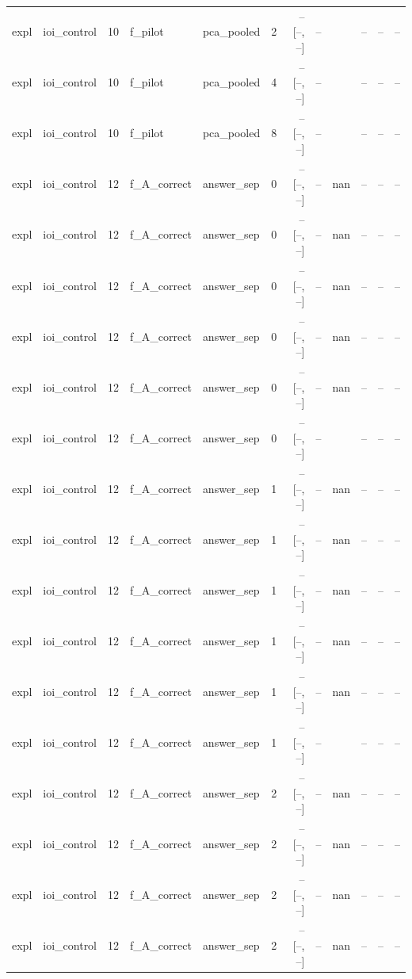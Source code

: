 \begin{tabular}{llrllrrrlrrr}
expl & ioi\_control & 10 & f\_pilot & pca\_pooled & 2 & -- [--, --] & -- &  & -- & -- & -- \\
expl & ioi\_control & 10 & f\_pilot & pca\_pooled & 4 & -- [--, --] & -- &  & -- & -- & -- \\
expl & ioi\_control & 10 & f\_pilot & pca\_pooled & 8 & -- [--, --] & -- &  & -- & -- & -- \\
expl & ioi\_control & 12 & f\_A\_correct & answer\_sep & 0 & -- [--, --] & -- & nan & -- & -- & -- \\
expl & ioi\_control & 12 & f\_A\_correct & answer\_sep & 0 & -- [--, --] & -- & nan & -- & -- & -- \\
expl & ioi\_control & 12 & f\_A\_correct & answer\_sep & 0 & -- [--, --] & -- & nan & -- & -- & -- \\
expl & ioi\_control & 12 & f\_A\_correct & answer\_sep & 0 & -- [--, --] & -- & nan & -- & -- & -- \\
expl & ioi\_control & 12 & f\_A\_correct & answer\_sep & 0 & -- [--, --] & -- & nan & -- & -- & -- \\
expl & ioi\_control & 12 & f\_A\_correct & answer\_sep & 0 & -- [--, --] & -- &  & -- & -- & -- \\
expl & ioi\_control & 12 & f\_A\_correct & answer\_sep & 1 & -- [--, --] & -- & nan & -- & -- & -- \\
expl & ioi\_control & 12 & f\_A\_correct & answer\_sep & 1 & -- [--, --] & -- & nan & -- & -- & -- \\
expl & ioi\_control & 12 & f\_A\_correct & answer\_sep & 1 & -- [--, --] & -- & nan & -- & -- & -- \\
expl & ioi\_control & 12 & f\_A\_correct & answer\_sep & 1 & -- [--, --] & -- & nan & -- & -- & -- \\
expl & ioi\_control & 12 & f\_A\_correct & answer\_sep & 1 & -- [--, --] & -- & nan & -- & -- & -- \\
expl & ioi\_control & 12 & f\_A\_correct & answer\_sep & 1 & -- [--, --] & -- &  & -- & -- & -- \\
expl & ioi\_control & 12 & f\_A\_correct & answer\_sep & 2 & -- [--, --] & -- & nan & -- & -- & -- \\
expl & ioi\_control & 12 & f\_A\_correct & answer\_sep & 2 & -- [--, --] & -- & nan & -- & -- & -- \\
expl & ioi\_control & 12 & f\_A\_correct & answer\_sep & 2 & -- [--, --] & -- & nan & -- & -- & -- \\
expl & ioi\_control & 12 & f\_A\_correct & answer\_sep & 2 & -- [--, --] & -- & nan & -- & -- & -- \\

\end{tabular}
